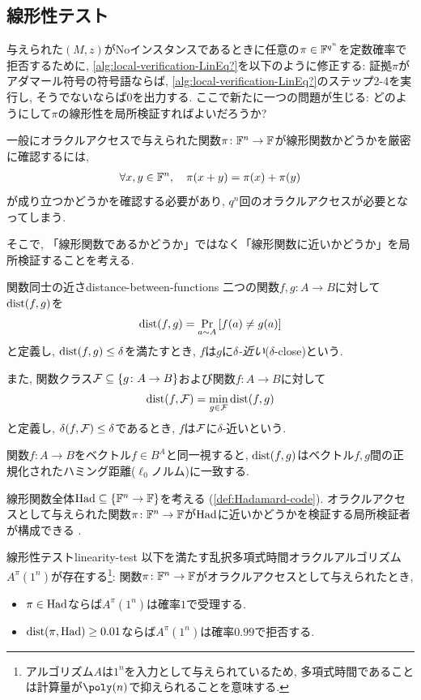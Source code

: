 \subsection{線形性テスト}
与えられた$(M,z)$がNoインスタンスであるときに任意の$\pi\in\mathbb{F}^{q^n}$を定数確率で拒否するために,
\cref{alg:local-verification-LinEq?}を以下のように修正する:
証拠$\pi$がアダマール符号の符号語ならば, \cref{alg:local-verification-LinEq?}のステップ2-4を実行し, そうでないならば$0$を出力する.
ここで新たに一つの問題が生じる: どのようにして$\pi$の線形性を局所検証すればよいだろうか?

一般にオラクルアクセスで与えられた関数$\pi\colon\mathbb{F}^n\to\mathbb{F}$が線形関数かどうかを厳密に確認するには,
\begin{align}
  \forall x,y\in\mathbb{F}^n,\quad \pi(x+y)=\pi(x)+\pi(y) \label{eq:linearity-test-all-points}
\end{align}
が成り立つかどうかを確認する必要があり, $q^n$回のオラクルアクセスが必要となってしまう.

そこで, 「線形関数であるかどうか」ではなく「線形関数に近いかどうか」を局所検証することを考える.
\begin{definition}{関数同士の近さ}{distance-between-functions}
  二つの関数$f,g\colon A \to B$に対して$\mathrm{dist}(f,g)$を
  \begin{align*}
    \mathrm{dist}(f,g) =\Pr_{a\sim A} \qty[ f(a) \ne g(a) ]
  \end{align*}
  と定義し, $\mathrm{dist}(f,g)\le\delta$を満たすとき, $f$は$g$に\emph{$\delta$-近い}($\delta$-close)という.
  
  また, 関数クラス$\mathcal{F}\subseteq \qty{ g\colon A\to B }$および関数$f\colon A\to B$に対して
  \begin{align*}
    \mathrm{dist}(f,\mathcal{F}) = \min_{g\in\mathcal{F}} \mathrm{dist}(f,g)
  \end{align*}
  と定義し, $\delta(f,\mathcal{F})\le \delta$であるとき, $f$は$\mathcal{F}$に$\delta$-近いという.
\end{definition}

関数$f\colon A\to B$をベクトル$f\in B^A$と同一視すると, $\mathrm{dist}(f,g)$はベクトル$f,g$間の正規化されたハミング距離($\ell_0$ノルム)に一致する.

線形関数全体$\mathrm{Had}\subseteq\qty{\mathbb{F}^n\to\mathbb{F}}$を考える (\cref{def:Hadamard-code}).
オラクルアクセスとして与えられた関数$\pi\colon \mathbb{F}^n\to\mathbb{F}$が$\mathrm{Had}$に近いかどうかを検証する局所検証者が構成できる \citet{BLR93}.

\begin{theorem}{線形性テスト}{linearity-test}
  以下を満たす乱択多項式時間オラクルアルゴリズム$A^\pi(1^n)$が存在する\footnote{アルゴリズム$A$は$1^n$を入力として与えられているため, 多項式時間であることは計算量が$\poly(n)$で抑えられることを意味する.}:
  関数$\pi\colon \mathbb{F}^n\to\mathbb{F}$がオラクルアクセスとして与えられたとき,
  \begin{itemize}
    \item $\pi\in \mathrm{Had}$ならば$A^\pi(1^n)$は確率$1$で受理する.
    \item $\mathrm{dist}(\pi,\mathrm{Had})\ge 0.01$ならば$A^\pi(1^n)$は確率$0.99$で拒否する.
  \end{itemize}
\end{theorem}

